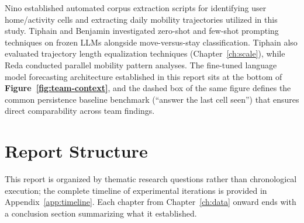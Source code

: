 

Nino established automated corpus extraction scripts for identifying user home/activity cells and extracting daily mobility trajectories utilized in this study. Tiphain and Benjamin investigated zero-shot and few-shot prompting techniques on frozen LLMs alongside move-versus-stay classification. Tiphain also evaluated trajectory length equalization techniques (Chapter~\ref{ch:scale}), while Reda conducted parallel mobility pattern analyses. The fine-tuned language model forecasting architecture established in this report sits at the bottom of \textbf{Figure~\ref{fig:team-context}}, and the dashed box of the same figure defines the common persistence baseline benchmark (``answer the last cell seen'') that ensures direct comparability across team findings.

\section{Report Structure}

This report is organized by thematic research questions rather than chronological execution; the complete timeline of experimental iterations is provided in Appendix~\ref{app:timeline}. Each chapter from Chapter~\ref{ch:data} onward ends with a conclusion section summarizing what it established.

